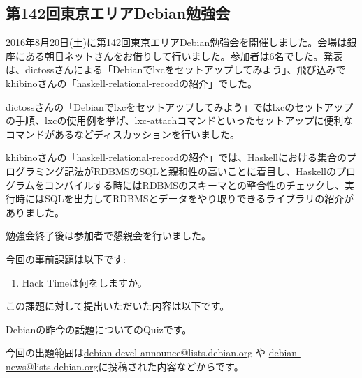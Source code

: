 \documentclass[mingoth,a4paper]{jsarticle}
\begin{document}

\subsection{第142回東京エリアDebian勉強会}

2016年8月20日(土)に第142回東京エリアDebian勉強会を開催しました。会場は銀座にある朝日ネットさんをお借りして行いました。参加者は6名でした。発表は、dictossさんによる「Debianでlxcをセットアップしてみよう」、飛び込みでkhibinoさんの「haskell-relational-recordの紹介」でした。

dictossさんの「Debianでlxcをセットアップしてみよう」ではlxcのセットアップの手順、lxcの使用例を挙げ、lxc-attachコマンドといったセットアップに便利なコマンドがあるなどディスカッションを行いました。

khibinoさんの「haskell-relational-recordの紹介」では、Haskellにおける集合のプログラミング記法がRDBMSのSQLと親和性の高いことに着目し、Haskellのプログラムをコンパイルする時にはRDBMSのスキーマとの整合性のチェックし、実行時にはSQLを出力してRDBMSとデータをやり取りできるライブラリの紹介がありました。

勉強会終了後は参加者で懇親会を行いました。



今回の事前課題は以下です:
\begin{enumerate}
  \item Hack Timeは何をしますか。
\end{enumerate}
この課題に対して提出いただいた内容は以下です。
\begin{multicols}{2}
{\small

}
\end{multicols}


Debianの昨今の話題についてのQuizです。

今回の出題範囲は\url{debian-devel-announce@lists.debian.org} や \url{debian-news@lists.debian.org}に投稿された内容などからです。

\begin{multicols}{2}

\end{multicols}



\end{document}
